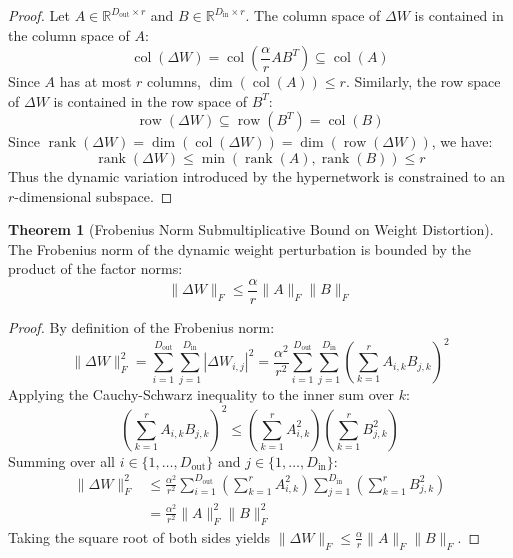 \documentclass[11pt,a4paper]{article}
\theoremstyle{definition}
\newtheorem{theorem}{\textbf{Theorem}}[section]
\begin{document}
\begin{proof}
Let $A \in \mathbb{R}^{D_{\text{out}} \times r}$ and $B \in \mathbb{R}^{D_{\text{in}} \times r}$.
The column space of $\Delta W$ is contained in the column space of $A$:
{\boldmath
\begin{equation}
\operatorname{col}(\Delta W) = \operatorname{col}\left(\frac{\alpha}{r} A B^T\right) \subseteq \operatorname{col}(A)
\end{equation}
}
Since $A$ has at most $r$ columns, $\dim(\operatorname{col}(A)) \le r$.
Similarly, the row space of $\Delta W$ is contained in the row space of $B^T$:
{\boldmath
\begin{equation}
\operatorname{row}(\Delta W) \subseteq \operatorname{row}(B^T) = \operatorname{col}(B)
\end{equation}
}
Since $\operatorname{rank}(\Delta W) = \dim(\operatorname{col}(\Delta W)) = \dim(\operatorname{row}(\Delta W))$, we have:
{\boldmath
\begin{equation}
\operatorname{rank}(\Delta W) \le \min\left( \operatorname{rank}(A), \operatorname{rank}(B) \right) \le r
\end{equation}
}
Thus the dynamic variation introduced by the hypernetwork is constrained to an $r$-dimensional subspace.
\end{proof}

\begin{theorem}[Frobenius Norm Submultiplicative Bound on Weight Distortion]
The Frobenius norm of the dynamic weight perturbation is bounded by the product of the factor norms:
{\boldmath
\begin{equation}
\|\Delta W\|_F \le \frac{\alpha}{r} \|A\|_F \|B\|_F
\end{equation}
}
\end{theorem}

\begin{proof}
By definition of the Frobenius norm:
{\boldmath
\begin{equation}
\|\Delta W\|_F^2 = \sum_{i=1}^{D_{\text{out}}} \sum_{j=1}^{D_{\text{in}}} |\Delta W_{i, j}|^2 = \frac{\alpha^2}{r^2} \sum_{i=1}^{D_{\text{out}}} \sum_{j=1}^{D_{\text{in}}} \left( \sum_{k=1}^r A_{i, k} B_{j, k} \right)^2
\end{equation}
}
Applying the Cauchy-Schwarz inequality to the inner sum over $k$:
{\boldmath
\begin{equation}
\left( \sum_{k=1}^r A_{i, k} B_{j, k} \right)^2 \le \left( \sum_{k=1}^r A_{i, k}^2 \right) \left( \sum_{k=1}^r B_{j, k}^2 \right)
\end{equation}
}
Summing over all $i \in \{1, \dots, D_{\text{out}}\}$ and $j \in \{1, \dots, D_{\text{in}}\}$:
{\boldmath
\begin{align}
\|\Delta W\|_F^2 &\le \frac{\alpha^2}{r^2} \sum_{i=1}^{D_{\text{out}}} \left( \sum_{k=1}^r A_{i, k}^2 \right) \sum_{j=1}^{D_{\text{in}}} \left( \sum_{k=1}^r B_{j, k}^2 \right) \\
&= \frac{\alpha^2}{r^2} \|A\|_F^2 \|B\|_F^2
\end{align}
}
Taking the square root of both sides yields $\|\Delta W\|_F \le \frac{\alpha}{r} \|A\|_F \|B\|_F$.
\end{proof}
\end{document}
